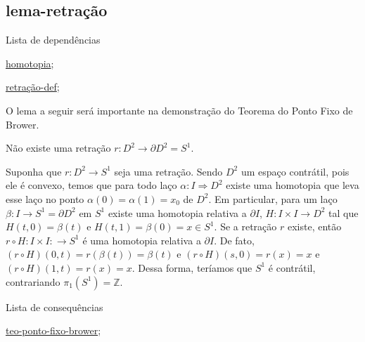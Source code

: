 \subsection{lema-retração} %
\label{lema-retração}
\begin{titlemize}{Lista de dependências}
	\item \hyperref[homotopia]{homotopia};\\ %
	\item \hyperref[retração-def]{retração-def};\\
\end{titlemize}
O lema a seguir será importante na demonstração do Teorema do Ponto Fixo de Brower.
\begin{lemma}[Lema da Retração]%
	Não existe uma retração $r:D^2 \longrightarrow \partial D^2 = S^1$.
\end{lemma}

\begin{dem}
Suponha que $r:D^2 \longrightarrow S^1$ seja uma retração. Sendo $D^2$ um espaço contrátil, pois ele é convexo, temos que para todo laço $\alpha: I \Longrightarrow D^2$ existe uma homotopia que leva esse laço no ponto $\alpha(0) = \alpha(1) = x_0$ de $D^2$. Em particular, para um laço $\beta: I \longrightarrow S^1 = \partial D^2$ em $S^1$ existe uma homotopia relativa a $\partial I$, $H: I\times I \longrightarrow D^2$ tal que $H(t, 0) = \beta(t)$ e $H(t, 1) = \beta(0) = x \in S^1$. Se a retração $r$ existe, então $r\circ H: I\times I: \longrightarrow S^1$ é uma homotopia relativa a $\partial I$. De fato, $(r\circ H)(0, t) = r(\beta(t)) = \beta(t)$ e $(r\circ H)(s, 0) = r(x) = x$ e $(r\circ H)(1, t) = r(x) = x$. Dessa forma, teríamos que $S^1$ é contrátil, contrariando $\pi_1(S^1) = \mathbb{Z}$.
\end{dem}

\begin{titlemize}{Lista de consequências}
	\item \hyperref[teo-ponto-fixo-brower]{teo-ponto-fixo-brower};\\ %
	\item \hyperref[]{}
\end{titlemize}

